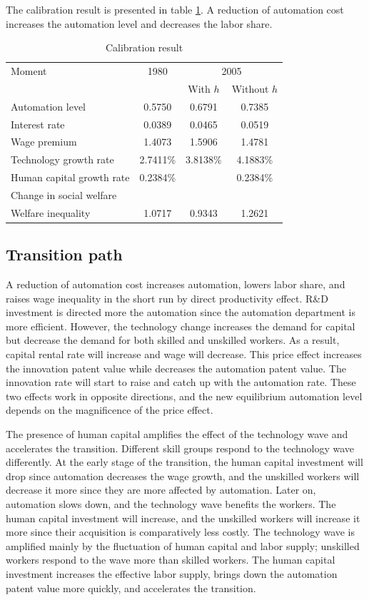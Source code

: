 \documentclass[12pt]{article}
\begin{document}
The calibration result is presented in table \ref{result}. A reduction of automation cost increases the automation level and decreases the labor share. 
\begin{table}
\center
\begin{tabular}{l|c|cc}
\hline \hline
Moment & 1980 &  \multicolumn{2}{c}{2005} \\ 
&  & With $h$ &  Without $h$ \\ \hline
Automation level & 0.5750 & 0.6791 & 0.7385 \\
Interest rate & 0.0389 & 0.0465 & 0.0519 \\
Wage premium   & 1.4073 &1.5906  & 1.4781\\
Technology growth rate  & 2.7411\% & 3.8138\% & 4.1883\%\\
Human capital growth rate  & 0.2384\% & & 0.2384\%\\
Change in social welfare  & & &\\
Welfare inequality  & 1.0717 & 0.9343 & 1.2621 \\ \hline
\end{tabular}
\caption{Calibration result}
\label{result}
\end{table}


\subsection{Transition path}

A reduction of automation cost increases automation, lowers labor share, and raises wage inequality in the short run by direct productivity effect. R\&D investment is directed more the automation since the automation department is more efficient. However, the technology change increases the demand for capital but decrease the demand for both skilled and unskilled workers. As a result, capital rental rate will increase and wage will decrease. This price effect increases the innovation patent value while decreases the automation patent value. The innovation rate will start to raise and catch up with the automation rate. These two effects work in opposite directions, and the new equilibrium automation level depends on the magnificence of the price effect. 

The presence of human capital amplifies the effect of the technology wave and accelerates the transition. Different skill groups respond to the technology wave differently. At the early stage of the transition, the human capital investment will drop since automation decreases the wage growth, and the unskilled workers will decrease it more since they are more affected by automation. Later on, automation slows down, and the technology wave benefits the workers. The human capital investment will increase, and the unskilled workers will increase it more since their acquisition is comparatively less costly. The technology wave is amplified mainly by the fluctuation of human capital and labor supply; unskilled workers respond to the wave more than skilled workers. The human capital investment increases the effective labor supply, brings down the automation patent value more quickly, and accelerates the transition. 
\end{document}
